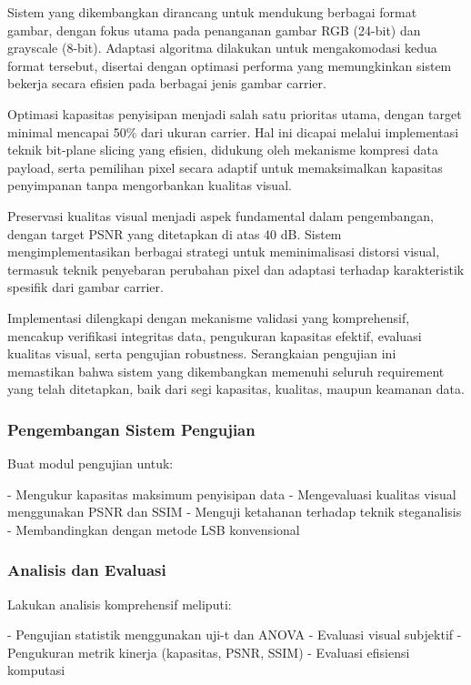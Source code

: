 \documentclass{ittelkom}
\begin{document}
Sistem yang dikembangkan dirancang untuk mendukung berbagai format gambar,
dengan fokus utama pada penanganan gambar RGB (24-bit) dan grayscale (8-bit).
Adaptasi algoritma dilakukan untuk mengakomodasi kedua format tersebut,
disertai dengan optimasi performa yang memungkinkan sistem bekerja secara
efisien pada berbagai jenis gambar carrier.

Optimasi kapasitas penyisipan menjadi salah satu prioritas utama, dengan target
minimal mencapai 50\% dari ukuran carrier. Hal ini dicapai melalui implementasi
teknik bit-plane slicing yang efisien, didukung oleh mekanisme kompresi data
payload, serta pemilihan pixel secara adaptif untuk memaksimalkan kapasitas
penyimpanan tanpa mengorbankan kualitas visual.

Preservasi kualitas visual menjadi aspek fundamental dalam pengembangan, dengan
target PSNR yang ditetapkan di atas 40 dB. Sistem mengimplementasikan berbagai
strategi untuk meminimalisasi distorsi visual, termasuk teknik penyebaran
perubahan pixel dan adaptasi terhadap karakteristik spesifik dari gambar
carrier.

Implementasi dilengkapi dengan mekanisme validasi yang komprehensif, mencakup
verifikasi integritas data, pengukuran kapasitas efektif, evaluasi kualitas
visual, serta pengujian robustness. Serangkaian pengujian ini memastikan bahwa
sistem yang dikembangkan memenuhi seluruh requirement yang telah ditetapkan,
baik dari segi kapasitas, kualitas, maupun keamanan data.

\subsubsection{Pengembangan Sistem Pengujian}

Buat modul pengujian untuk:

- Mengukur kapasitas maksimum penyisipan data
- Mengevaluasi kualitas visual menggunakan PSNR dan SSIM
- Menguji ketahanan terhadap teknik steganalisis
- Membandingkan dengan metode LSB konvensional

\subsubsection{Analisis dan Evaluasi}

Lakukan analisis komprehensif meliputi:

- Pengujian statistik menggunakan uji-t dan ANOVA
- Evaluasi visual subjektif
- Pengukuran metrik kinerja (kapasitas, PSNR, SSIM)
- Evaluasi efisiensi komputasi
\end{document}
